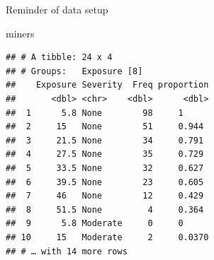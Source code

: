 \documentclass[ignorenonframetext,]{beamer}
\newenvironment{Shaded}{\begin{snugshade}}{\end{snugshade}}
\newcommand{\NormalTok}[1]{#1}
\begin{document}
\begin{frame}[fragile]{Reminder of data setup}
\protect\hypertarget{reminder-of-data-setup}{}

\footnotesize

\begin{Shaded}
\begin{Highlighting}[]
\NormalTok{miners}
\end{Highlighting}
\end{Shaded}

\begin{verbatim}
## # A tibble: 24 x 4
## # Groups:   Exposure [8]
##    Exposure Severity  Freq proportion
##       <dbl> <chr>    <dbl>      <dbl>
##  1      5.8 None        98     1     
##  2     15   None        51     0.944 
##  3     21.5 None        34     0.791 
##  4     27.5 None        35     0.729 
##  5     33.5 None        32     0.627 
##  6     39.5 None        23     0.605 
##  7     46   None        12     0.429 
##  8     51.5 None         4     0.364 
##  9      5.8 Moderate     0     0     
## 10     15   Moderate     2     0.0370
## # … with 14 more rows
\end{verbatim}

\normalsize

\end{frame}
\end{document}

